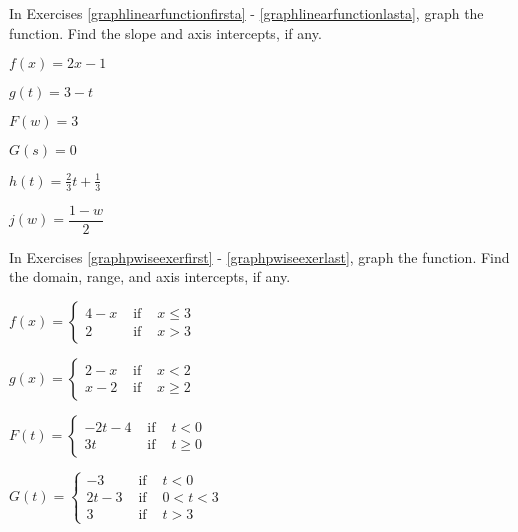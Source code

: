 \startexenum

In Exercises \ref{graphlinearfunctionfirsta} - \ref{graphlinearfunctionlasta}, graph the function.  Find the slope and  axis intercepts, if any.

\begin{shortexenum}

\item $f(x) = 2x - 1$ \label{graphlinearfunctionfirsta}
\item $g(t) = 3 - t$
\item $F(w) = 3$
\item $G(s) = 0$
\item $h(t) = \frac{2}{3} t + \frac{1}{3}$ 
\item $j(w) = \dfrac{1-w}{2}$  \label{graphlinearfunctionlasta}

\end{shortexenum}

In Exercises \ref{graphpwiseexerfirst} - \ref{graphpwiseexerlast}, graph the function.  Find the domain, range, and axis intercepts, if any.

\begin{shortexenum}

\item ${\displaystyle f(x) = \left\{ \begin{array}{rcl} 4-x & \mbox{ if } &  x \leq 3 \\
                                                            2 & \mbox{ if } & x > 3
                                     \end{array} \right. }$   \label{graphpwiseexerfirst}

\item ${\displaystyle g(x) = \left\{ \begin{array}{rcl} 2-x & \mbox{ if } &  x < 2 \\
                                                            x-2 & \mbox{ if } & x \geq  2
                                     \end{array} \right. }$


\item ${\displaystyle F(t) = \left\{ \begin{array}{rcl} -2t - 4 & \mbox{ if } &  t < 0 \\
                                                             3t & \mbox{ if } & t \geq 0
                                     \end{array} \right. }$


\item ${\displaystyle G(t) = \left\{ \begin{array}{rcl}  -3 & \mbox{ if } & t < 0 \\
                                                        2t-3 & \mbox{ if } & 0 < t < 3 \\
                                                            3 & \mbox{ if } & t > 3
                                     \end{array} \right. }$  \label{graphpwiseexerlast}

 \label{graphlineexerlast}

\end{shortexenum}


